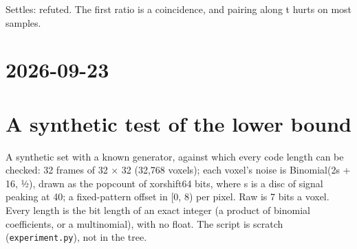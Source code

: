 Settles: refuted. The first ratio is a coincidence, and pairing along t hurts on most samples.

\section{\texorpdfstring{2026-09-23}{2026-09-23}}

\section{\texorpdfstring{A synthetic test of the lower bound}{A synthetic test of the lower bound}}

A synthetic set with a known generator, against which every code length can be checked: 32 frames of 32 × 32 (32,768 voxels); each voxel's noise is Binomial(2s + 16, ½), drawn as the popcount of xorshift64 bits, where s is a disc of signal peaking at 40; a fixed-pattern offset in [0, 8) per pixel. Raw is 7 bits a voxel. Every length is the bit length of an exact integer (a product of binomial coefficients, or a multinomial), with no float. The script is scratch (\texttt{experiment.\allowbreak{}py}), not in the tree.

